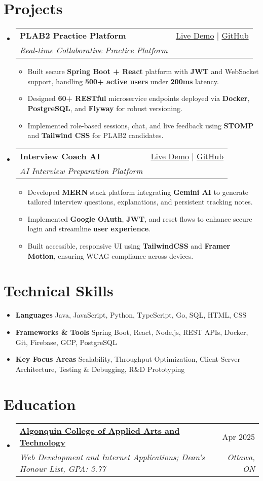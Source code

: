 \documentclass[letterpaper,11pt]{article}
\makeatletter
\newcommand{\resumeItem}[1]{\item\small{#1 \vspace{-2pt}}}
\newcommand{\resumeSubheading}[4]{
  \vspace{-1pt}\item
    \begin{tabular*}{0.97\textwidth}[t]{l@{\extracolsep{\fill}}r}
      \textbf{#1} & #2 \\
      \textit{\small#3} & \textit{\small #4} \\
    \end{tabular*}\vspace{-5pt}
}
\newcommand{\resumeSubHeadingListStart}{\begin{itemize}[leftmargin=*]}
\newcommand{\resumeSubHeadingListEnd}{\end{itemize}}
\newcommand{\resumeItemListStart}{\begin{itemize}}
\newcommand{\resumeItemListEnd}{\end{itemize}\vspace{-5pt}}
\makeatother
\begin{document}
\section{Projects}
  \resumeSubHeadingListStart
    \resumeSubheading
      {\textbf{PLAB2 Practice Platform}}{\href{https://plab2practice.com}{Live Demo} | \href{https://github.com/altansaid/plab2projectnew}{GitHub}}
      {Real-time Collaborative Practice Platform}{}
      \resumeItemListStart
        \resumeItem{Built secure \textbf{Spring Boot + React} platform with \textbf{JWT} and WebSocket support, handling \textbf{500+ active users} under \textbf{200ms} latency.}
        \resumeItem{Designed \textbf{60+ RESTful} microservice endpoints deployed via \textbf{Docker}, \textbf{PostgreSQL}, and \textbf{Flyway} for robust versioning.}
        \resumeItem{Implemented role-based sessions, chat, and live feedback using \textbf{STOMP} and \textbf{Tailwind CSS} for PLAB2 candidates.}
      \resumeItemListEnd

    \resumeSubheading
      {\textbf{Interview Coach AI}}{\href{https://interviewcoach-ai.vercel.app/}{Live Demo} | \href{https://github.com/altansaid/interviewcoach-ai}{GitHub}}
      {AI Interview Preparation Platform}{}
      \resumeItemListStart
        \resumeItem{Developed \textbf{MERN} stack platform integrating \textbf{Gemini AI} to generate tailored interview questions, explanations, and persistent tracking notes.}
        \resumeItem{Implemented \textbf{Google OAuth}, \textbf{JWT}, and reset flows to enhance secure login and streamline \textbf{user experience}.}
        \resumeItem{Built accessible, responsive UI using \textbf{TailwindCSS} and \textbf{Framer Motion}, ensuring WCAG compliance across devices.}
      \resumeItemListEnd
  \resumeSubHeadingListEnd

\section{Technical Skills}
  \resumeItemListStart
    \resumeItem{\textbf{Languages}}{Java, JavaScript, Python, TypeScript, Go, SQL, HTML, CSS}
    \resumeItem{\textbf{Frameworks \& Tools}}{Spring Boot, React, Node.js, REST APIs, Docker, Git, Firebase, GCP, PostgreSQL}
    \resumeItem{\textbf{Key Focus Areas}}{Scalability, Throughput Optimization, Client-Server Architecture, Testing \& Debugging, R\&D Prototyping}
  \resumeItemListEnd

\section{Education}
  \resumeSubHeadingListStart
    \resumeSubheading
      {\href{https://www.algonquincollege.com/sat/program/web-development-internet-applications/}{Algonquin College of Applied Arts and Technology}}{Apr 2025}
      {Web Development and Internet Applications; Dean's Honour List, GPA: 3.77}{Ottawa, ON}
  \resumeSubHeadingListEnd
\end{document}
